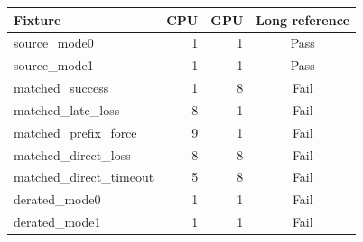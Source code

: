 \begin{center}\small
\begin{tabular}{lrrc}
\toprule
Fixture & CPU & GPU & Long reference \\
\midrule
source\_mode0 & 1 & 1 & Pass\\
source\_mode1 & 1 & 1 & Pass\\
matched\_success & 1 & 8 & Fail\\
matched\_late\_loss & 8 & 1 & Fail\\
matched\_prefix\_force & 9 & 1 & Fail\\
matched\_direct\_loss & 8 & 8 & Fail\\
matched\_direct\_timeout & 5 & 8 & Fail\\
derated\_mode0 & 1 & 1 & Fail\\
derated\_mode1 & 1 & 1 & Fail\\
\bottomrule
\end{tabular}
\end{center}
